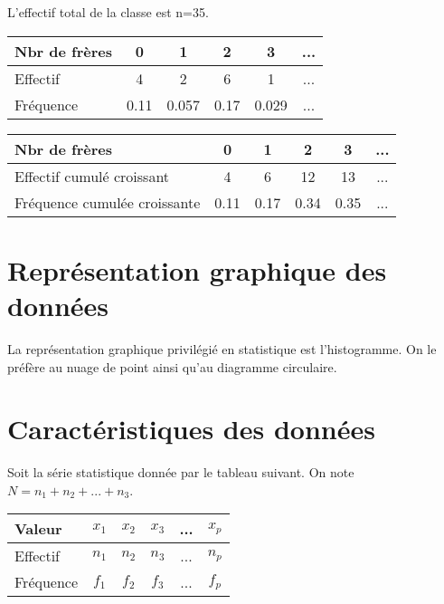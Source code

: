 \documentclass[paper=a4, fontsize=9pt]{scrartcl} %
\begin{document}
L'effectif total de la classe est n=35.

\begin{multicols}{2}

  \begin{center}
    \begin{tabular}{| l || c | c | c | c | c |}
      \hline
      Nbr de frères & 0 & 1 & 2 & 3 & ...\\
      \hline
      Effectif      & 4 & 2 & 6 & 1 & ...\\
      \hline
      Fréquence     & 0.11 & 0.057 & 0.17 & 0.029 & ...\\
      \hline
    \end{tabular}
  \end{center}

  \begin{center}
    \begin{tabular}{| l || c | c | c | c | c |}
      \hline
      Nbr de frères & 0 & 1 & 2 & 3 & ...\\
      \hline
      Effectif cumulé croissant & 4 & 6 & 12 & 13 & ...\\
      \hline
      Fréquence cumulée croissante & 0.11 & 0.17 & 0.34 & 0.35 & ...\\
      \hline
    \end{tabular}
  \end{center}

\end{multicols}
\begin{multicols}{2}
  \section{Représentation graphique des données}

  La représentation graphique privilégié en statistique est l'histogramme. On le préfère au nuage de point ainsi qu'au diagramme circulaire.

  \section{Caractéristiques des données}

  Soit la série statistique donnée par le tableau suivant. On note $N = n_1 + n_2 + ... + n_3$.

  \begin{center}
    \begin{tabular}{| l || c | c | c | c | c |}
      \hline
      Valeur    & $x_1$ & $x_2$ & $x_3$ & ... & $x_p$\\
      \hline
      Effectif  & $n_1$ & $n_2$ & $n_3$ & ... & $n_p$\\
      \hline
      Fréquence & $f_1$ & $f_2$ & $f_3$ & ... & $f_p$\\
      \hline
    \end{tabular}
  \end{center}
\end{multicols}
\end{document}
